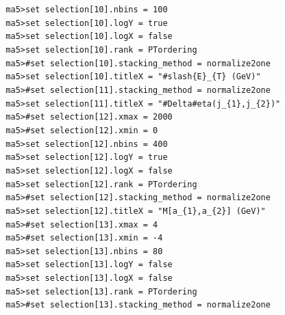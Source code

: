 \documentclass[a4paper, 10pt]{article}
\begin{document}
\texttt{ }\texttt{ }\texttt{ma5>set selection[10].nbins = 100\\
}
\texttt{ }\texttt{ }\texttt{ma5>set selection[10].logY = true\\
}
\texttt{ }\texttt{ }\texttt{ma5>set selection[10].logX = false\\
}
\texttt{ }\texttt{ }\texttt{ma5>set selection[10].rank = PTordering\\
}
\texttt{ }\texttt{ }\texttt{ma5>\#set selection[10].stacking\_method = normalize2one\\
}
\texttt{ }\texttt{ }\texttt{ma5>set selection[10].titleX = "\#slash\{E\}\_\{T\} (GeV)"\\
}
\texttt{ }\texttt{ }\texttt{ma5>\#set selection[11].stacking\_method = normalize2one\\
}
\texttt{ }\texttt{ }\texttt{ma5>set selection[11].titleX = "\#Delta\#eta(j\_\{1\},j\_\{2\})"\\
}
\texttt{ }\texttt{ }\texttt{ma5>\#set selection[12].xmax = 2000\\
}
\texttt{ }\texttt{ }\texttt{ma5>\#set selection[12].xmin = 0\\
}
\texttt{ }\texttt{ }\texttt{ma5>set selection[12].nbins = 400\\
}
\texttt{ }\texttt{ }\texttt{ma5>set selection[12].logY = true\\
}
\texttt{ }\texttt{ }\texttt{ma5>set selection[12].logX = false\\
}
\texttt{ }\texttt{ }\texttt{ma5>set selection[12].rank = PTordering\\
}
\texttt{ }\texttt{ }\texttt{ma5>\#set selection[12].stacking\_method = normalize2one\\
}
\texttt{ }\texttt{ }\texttt{ma5>set selection[12].titleX = "M[a\_\{1\},a\_\{2\}] (GeV)"\\
}
\texttt{ }\texttt{ }\texttt{ma5>\#set selection[13].xmax = 4\\
}
\texttt{ }\texttt{ }\texttt{ma5>\#set selection[13].xmin = -4\\
}
\texttt{ }\texttt{ }\texttt{ma5>set selection[13].nbins = 80\\
}
\texttt{ }\texttt{ }\texttt{ma5>set selection[13].logY = false\\
}
\texttt{ }\texttt{ }\texttt{ma5>set selection[13].logX = false\\
}
\texttt{ }\texttt{ }\texttt{ma5>set selection[13].rank = PTordering\\
}
\texttt{ }\texttt{ }\texttt{ma5>\#set selection[13].stacking\_method = normalize2one\\
}
\end{document}
